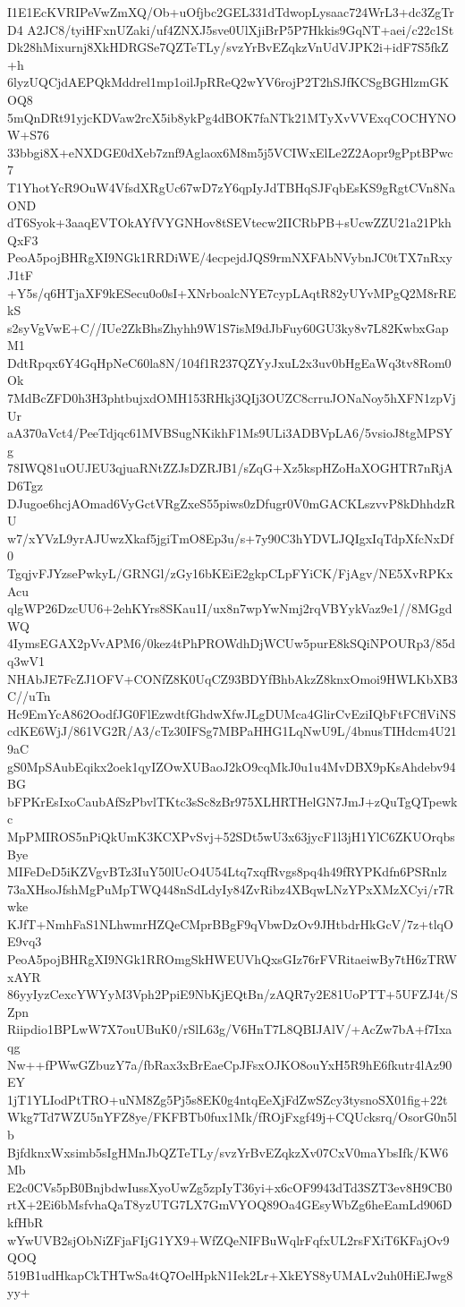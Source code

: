 I1E1EcKVRIPeVwZmXQ/Ob+uOfjbc2GEL331dTdwopLysaac724WrL3+dc3ZgTrD4
A2JC8/tyiHFxnUZaki/uf4ZNXJ5sve0UlXjiBrP5P7Hkkis9GqNT+aei/c22c1St
Dk28hMixurnj8XkHDRGSe7QZTeTLy/svzYrBvEZqkzVnUdVJPK2i+idF7S5fkZ+h
6lyzUQCjdAEPQkMddrel1mp1oilJpRReQ2wYV6rojP2T2hSJfKCSgBGHlzmGKOQ8
5mQnDRt91yjcKDVaw2rcX5ib8ykPg4dBOK7faNTk21MTyXvVVExqCOCHYNOW+S76
33bbgi8X+eNXDGE0dXeb7znf9Aglaox6M8m5j5VCIWxElLe2Z2Aopr9gPptBPwc7
T1YhotYcR9OuW4VfsdXRgUc67wD7zY6qpIyJdTBHqSJFqbEsKS9gRgtCVn8NaOND
dT6Syok+3aaqEVTOkAYfVYGNHov8tSEVtecw2IICRbPB+sUcwZZU21a21PkhQxF3
PeoA5pojBHRgXI9NGk1RRDiWE/4ecpejdJQS9rmNXFAbNVybnJC0tTX7nRxyJ1tF
+Y5s/q6HTjaXF9kESecu0o0sI+XNrboalcNYE7cypLAqtR82yUYvMPgQ2M8rREkS
s2syVgVwE+C//IUe2ZkBhsZhyhh9W1S7isM9dJbFuy60GU3ky8v7L82KwbxGapM1
DdtRpqx6Y4GqHpNeC60la8N/104f1R237QZYyJxuL2x3uv0bHgEaWq3tv8Rom0Ok
7MdBcZFD0h3H3phtbujxdOMH153RHkj3QIj3OUZC8crruJONaNoy5hXFN1zpVjUr
aA370aVct4/PeeTdjqc61MVBSugNKikhF1Ms9ULi3ADBVpLA6/5vsioJ8tgMPSYg
78IWQ81uOUJEU3qjuaRNtZZJsDZRJB1/sZqG+Xz5kspHZoHaXOGHTR7nRjAD6Tgz
DJugoe6hcjAOmad6VyGctVRgZxeS55piws0zDfugr0V0mGACKLszvvP8kDhhdzRU
w7/xYVzL9yrAJUwzXkaf5jgiTmO8Ep3u/s+7y90C3hYDVLJQIgxIqTdpXfcNxDf0
TgqjvFJYzsePwkyL/GRNGl/zGy16bKEiE2gkpCLpFYiCK/FjAgv/NE5XvRPKxAcu
qlgWP26DzcUU6+2ehKYrs8SKau1I/ux8n7wpYwNmj2rqVBYykVaz9e1//8MGgdWQ
4IymsEGAX2pVvAPM6/0kez4tPhPROWdhDjWCUw5purE8kSQiNPOURp3/85dq3wV1
NHAbJE7FcZJ1OFV+CONfZ8K0UqCZ93BDYfBhbAkzZ8knxOmoi9HWLKbXB3C//uTn
Hc9EmYcA862OodfJG0FlEzwdtfGhdwXfwJLgDUMca4GlirCvEziIQbFtFCflViNS
cdKE6WjJ/861VG2R/A3/cTz30IFSg7MBPaHHG1LqNwU9L/4bnusTIHdcm4U219aC
gS0MpSAubEqikx2oek1qyIZOwXUBaoJ2kO9cqMkJ0u1u4MvDBX9pKsAhdebv94BG
bFPKrEsIxoCaubAfSzPbvlTKtc3sSc8zBr975XLHRTHelGN7JmJ+zQuTgQTpewkc
MpPMIROS5nPiQkUmK3KCXPvSvj+52SDt5wU3x63jycF1l3jH1YlC6ZKUOrqbsBye
MIFeDeD5iKZVgvBTz3IuY50lUcO4U54Ltq7xqfRvgs8pq4h49fRYPKdfn6PSRnlz
73aXHsoJfshMgPuMpTWQ448nSdLdyIy84ZvRibz4XBqwLNzYPxXMzXCyi/r7Rwke
KJfT+NmhFaS1NLhwmrHZQeCMprBBgF9qVbwDzOv9JHtbdrHkGcV/7z+tlqOE9vq3
PeoA5pojBHRgXI9NGk1RROmgSkHWEUVhQxsGIz76rFVRitaeiwBy7tH6zTRWxAYR
86yyIyzCexcYWYyM3Vph2PpiE9NbKjEQtBn/zAQR7y2E81UoPTT+5UFZJ4t/SZpn
Riipdio1BPLwW7X7ouUBuK0/rSlL63g/V6HnT7L8QBIJAlV/+AcZw7bA+f7Ixaqg
Nw++fPWwGZbuzY7a/fbRax3xBrEaeCpJFsxOJKO8ouYxH5R9hE6fkutr4lAz90EY
1jT1YLIodPtTRO+uNM8Zg5Pj5s8EK0g4ntqEeXjFdZwSZcy3tysnoSX01fig+22t
Wkg7Td7WZU5nYFZ8ye/FKFBTb0fux1Mk/fROjFxgf49j+CQUcksrq/OsorG0n5lb
BjfdknxWxsimb5sIgHMnJbQZTeTLy/svzYrBvEZqkzXv07CxV0maYbsIfk/KW6Mb
E2c0CVs5pB0BnjbdwIussXyoUwZg5zpIyT36yi+x6cOF9943dTd3SZT3ev8H9CB0
rtX+2Ei6bMsfvhaQaT8yzUTG7LX7GmVYOQ89Oa4GEsyWbZg6heEamLd906DkfHbR
wYwUVB2sjObNiZFjaFIjG1YX9+WfZQeNIFBuWqlrFqfxUL2rsFXiT6KFajOv9QOQ
519B1udHkapCkTHTwSa4tQ7OelHpkN1Iek2Lr+XkEYS8yUMALv2uh0HiEJwg8yy+
